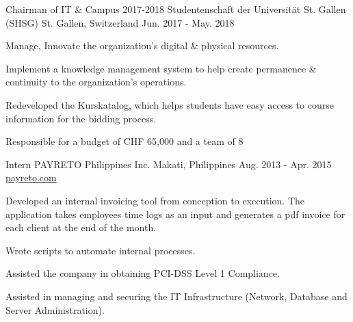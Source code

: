 \begin{cventries}
  \cventry
    {Chairman of IT \& Campus 2017-2018} %
    {Studentenschaft der Universität St. Gallen (SHSG)} %
    {St. Gallen, Switzerland} %
    {Jun. 2017 - May. 2018} %
    {} %
    {
      \begin{cvitems} %
        \item {Manage, Innovate the organization's digital \& physical resources.}
        \item {Implement a knowledge management system to help create permanence \& continuity to the organization's operations.}
        \item {Redeveloped the Kurskatalog, which helps students have easy access to course information for the bidding process.}
        \item {Responsible for a budget of CHF 65,000 and a team of 8 }
      \end{cvitems}
    }
  \cventry
    {Intern} %
    {PAYRETO Philippines Inc.} %
    {Makati, Philippines} %
    {Aug. 2013 - Apr. 2015} %
    {\href{https://payreto.com}{payreto.com}} %
    {
      \begin{cvitems} %
        \item {Developed an internal invoicing tool from conception to execution. The application takes employees time logs as an input and generates a pdf invoice for each client at the end of the month.}
        \item {Wrote scripts to automate internal processes.}
        \item {Assisted the company in obtaining PCI-DSS Level 1 Compliance.}
        \item {Assisted in managing and securing the IT Infrastructure (Network, Database and Server Administration).}

\end{cvitems}}
\end{cventries}
